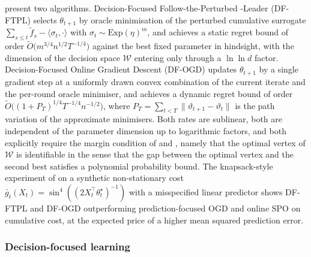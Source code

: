 \citet{Capitaine2025} present two algorithms. Decision-Focused Follow-the-Perturbed
-Leader (DF-FTPL) selects $\theta_{t+1}$ by oracle minimisation of the perturbed
cumulative surrogate $\sum_{s \le t} \widetilde f_s - \langle \sigma_t, \cdot
\rangle$ with $\sigma_t \sim \mathrm{Exp}(\eta)^m$, and achieves a static regret
bound of order $\widetilde O\bigl( m^{3/4} n^{1/2} T^{-1/4} \bigr)$ against the
best fixed parameter in hindsight, with the dimension of the decision space
$\mathcal W$ entering only through a $\ln \ln d$ factor. Decision-Focused Online
Gradient Descent (DF-OGD) updates $\theta_{t+1}$ by a single gradient step at a
uniformly drawn convex combination of the current iterate and the per-round oracle
minimiser, and achieves a dynamic regret bound of order
$\widetilde O\bigl( (1 + P_T)^{1/4} T^{-1/4} n^{-1/2} \bigr)$, where
$P_T = \sum_{t < T} \lVert \vartheta_{t+1} - \vartheta_t \rVert$ is the path
variation of the approximate minimisers. Both rates are sublinear, both are
independent of the parameter dimension up to logarithmic factors, and both
explicitly require the margin condition of \citet{Mammen1999} and
\citet{Tsybakov2004}, namely that the optimal vertex of $\mathcal W$ is
identifiable in the sense that the gap between the optimal vertex and the second
best satisfies a polynomial probability bound. The knapsack-style experiment of
\citet{Capitaine2025} on a synthetic non-stationary cost
$\bar g_t(X_t) = \sin^4((2 X_t^\top \theta_t^\star)^{-1})$ with a misspecified
linear predictor shows DF-FTPL and DF-OGD outperforming prediction-focused OGD
and online SPO on cumulative cost, at the expected price of a higher mean squared
prediction error.

\subsubsection{Decision-focused learning}
\label{sec:dfl}

